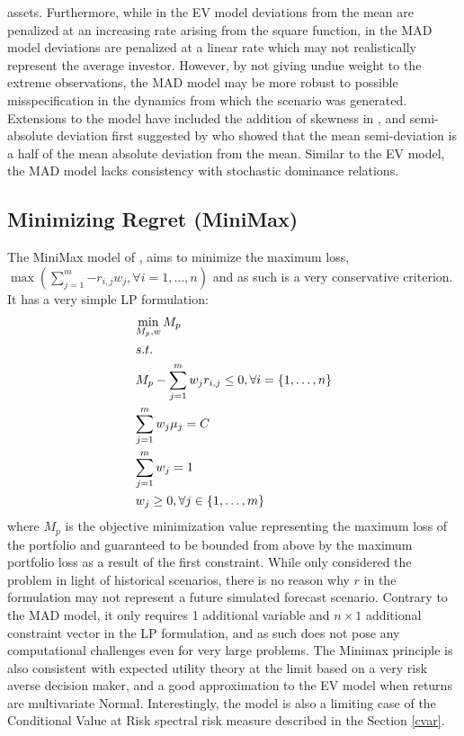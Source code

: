 assets. Furthermore, while in the EV model deviations from the mean are
penalized at an increasing rate arising from the square function, in the MAD
model deviations are penalized at a linear rate which may not realistically
represent the average investor. However, by not giving undue weight to the
extreme observations, the MAD model may be more robust to possible
misspecification in the dynamics from which the scenario was generated.
Extensions to the model have included the addition of skewness in
\citet{Konno1993}, and semi-absolute deviation first suggested by
\citet{Speranza1993} who showed that the mean semi-deviation is a half
of the mean absolute deviation from the mean. Similar to the EV model, the
MAD model lacks consistency with stochastic dominance relations.
\subsection{Minimizing Regret (MiniMax)}
The MiniMax model of \citet{Young1998a}, aims to minimize the maximum loss,
$\max \left( {\sum\limits_{j=1}^m {- {r_{i,j}}{w_j}} ,\forall i=1,\dots,n} \right)$
and as such is a very conservative criterion. It has a very simple LP formulation:
\begin{equation}\label{eq:minimax}
\begin{gathered}
  \mathop {\min }\limits_{{M_p},w} {M_p} \hfill \\
  s.t. \hfill \\
  {M_p} - \sum\limits_{j=1}^m {{w_j}} {r_{i,j}} \leq 0,\forall i=\left\{ {1,\dots,n} \right\} \hfill \\
  \sum\limits_{j=1}^m {{w_j}{\mu _j}=C}  \hfill \\
  \sum\limits_{j=1}^m {{w_j}=1}  \hfill \\
  {w_j} \geq 0,\forall j \in \left\{ {1,\dots,m} \right\} \hfill \\
\end{gathered}
\end{equation}
where $M_p$ is the objective minimization value representing the maximum loss
of the portfolio and guaranteed to be bounded from above by the maximum
portfolio loss as a result of the first constraint. While
\citet{Young1998a} only considered the problem in light of historical
scenarios, there is no reason why $r$ in the formulation may not represent a
future simulated forecast scenario. Contrary to the MAD model, it only
requires 1 additional variable and $n\times 1$ additional constraint vector
in the LP formulation, and as such does not pose any computational challenges
even for very large problems. The Minimax principle is also consistent with
expected utility theory at the limit based on a very risk averse decision
maker, and a good approximation to the EV model when returns are multivariate
Normal. Interestingly, the model is also a limiting case of the Conditional
Value at Risk spectral risk measure described in the Section \ref{cvar}.
